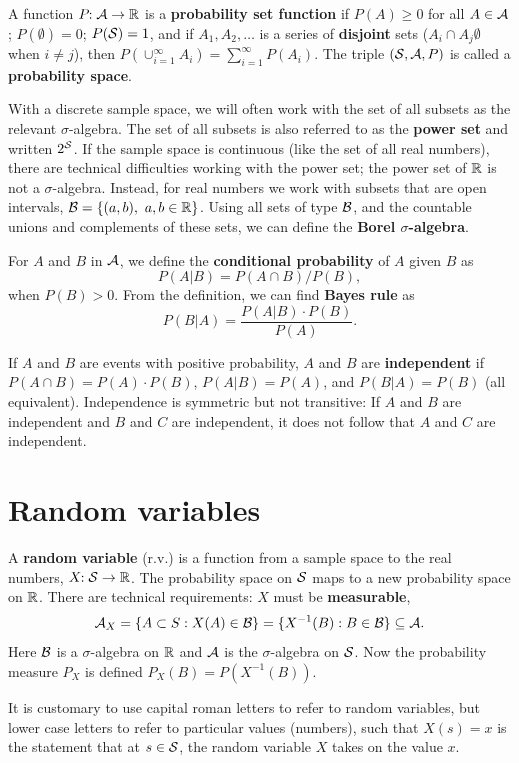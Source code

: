 \documentclass[twoside]{article}
\begin{document}
A function $P\!\!:\mathcal{A} \rightarrow \mathbb{R}$ is a \textbf{probability set function}  if $P(A)\geq0$ for
all $A\in\mathcal{A}$; $P(\emptyset)=0$; $P(\mathcal{S})=1$, and if $A_1,A_2,\dots$ is a
series of \textbf{disjoint} sets ($A_i\cap A_j\emptyset$ when $i\neq j$), then
$P(\cup_{i=1}^\infty A_i)=\sum_{i=1}^\infty P(A_i)$. The triple
$(\mathcal{S},\mathcal{A},P)$ is called a \textbf{probability space}.

With a discrete sample space, we will often work with the set of all subsets as
the relevant $\sigma$-algebra. The set of all subsets is also referred to as the
\textbf{power set} and written $2^{\mathcal{S}}$. If the sample space is continuous
(like the set of all real numbers), there are technical difficulties working
with the power set; the power set of $\mathbb{R}$ is not a $\sigma$-algebra. Instead,
for real numbers we work with subsets that are open intervals, $\mathcal{B} = \{(a,b),
\ a,b\in\mathbb{R}\}$. Using all sets of type $\mathcal{B}$, and the countable unions and
complements of these sets, we can define the \textbf{Borel $\sigma$-algebra}.

For $A$ and $B$ in $\mathcal{A}$, we define the \textbf{conditional probability} of $A$ given $B$
as \[ P(A|B) = P(A\cap B)/P(B),\] when $P(B)>0$. From the definition, we can find 
\textbf{Bayes rule}
as 
\[ P(B|A) = \frac{ P(A|B)\cdot P(B)}{P(A)}.\]

If $A$ and $B$ are events with positive probability, $A$ and $B$ are \textbf{independent} if
$P(A\cap B) = P(A)\cdot P(B)$, $P(A|B)=P(A)$, and $P(B|A)=P(B)$ (all equivalent). Independence
is symmetric but not transitive: If $A$ and $B$ are independent and $B$ and $C$ are independent,
it does not follow that $A$ and $C$ are independent.

\section{Random variables}

A \textbf{random variable}  (r.v.) is a function from a sample space to the real numbers,
$X\!\!: \mathcal{S} \rightarrow \mathbb{R}$. The probability space on $\mathcal{S}$ maps to a new
probability space on $\mathbb{R}$. There are technical requirements:
$X$ must be \textbf{measurable},
\[ \mathcal{A}_X = \{A\subset S: X(A) \in \mathcal{B}\} = \{X^{-1}(B): B\in \mathcal{B}\}\subseteq \mathcal{A}.\]
Here $\mathcal{B}$ is a $\sigma$-algebra on $\mathbb{R}$ and $\mathcal{A}$ is the $\sigma$-algebra on $\mathcal{S}$.
Now the probability measure $P_X$ is defined $P_X(B) = P(X^{-1}(B))$.

It is customary to use capital roman letters to refer to random variables, but
lower case letters to refer to particular values (numbers), such that $X(s)=x$
is the statement that at $s\in\mathcal{S}$, the random variable $X$ takes on the value $x$.
\end{document}
